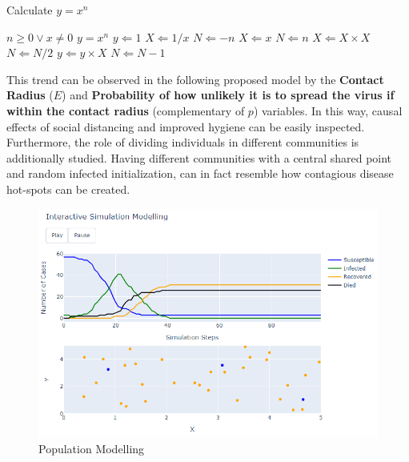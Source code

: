 \begin{algorithm}
\caption{Calculate $y = x^n$}
\label{alg1}
\vspace*{-.4cm}
\begin{multicols}{2}
\begin{algorithmic}[1]
  \REQUIRE $n \geq 0 \vee x \neq 0$
  \ENSURE $y = x^n$
  \STATE $y \Leftarrow 1$
  \STATE $X \Leftarrow 1 / x$
  \STATE $N \Leftarrow -n$
  \ELSE
  \STATE $X \Leftarrow x$
  \STATE $N \Leftarrow n$
  \ENDIF
  \STATE $X \Leftarrow X \times X$
  \STATE $N \Leftarrow N / 2$
  \ELSE[$N$ is odd]
  \STATE $y \Leftarrow y \times X$
  \STATE $N \Leftarrow N - 1$
  \ENDIF
  \ENDWHILE
\end{algorithmic}
\end{multicols}
\vspace*{-.3cm}
\end{algorithm}

This trend can be observed in the following proposed model by the \textbf{Contact Radius} ($E$) and \textbf{Probability of how unlikely it is to spread the virus if within the contact radius} (complementary of $p$) variables.
In this way, causal effects of social distancing and improved hygiene can be easily inspected. Furthermore, the role of dividing individuals in different communities is additionally studied. Having different communities with a central shared point and random infected initialization, can in fact resemble how contagious disease hot-spots can be created.

\begin{figure}[ht!]%
    \centering
    \includegraphics[width=13cm]{latex/images/pop.PNG}%
    \caption{Population Modelling}
    \label{pop}
\end{figure}

